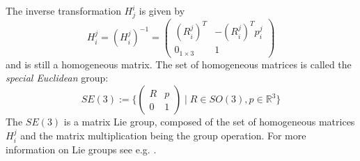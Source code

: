 \documentclass[a4paper,twoside, openright,12pt]{report}
\begin{document}
The inverse transformation $ H_j^i $ is given by 
\[H_i^j = (H_i^j)^{-1} = \begin{pmatrix}(R_i^j)^T & -(R_i^j)^T p_i^j \\ 0_{1 \times 3} & 1\end{pmatrix} \]
and is still a homogeneous matrix.
The set of homogeneous matrices is called the \emph{special Euclidean} group:
\begin{equation}
	SE(3) := \{\begin{pmatrix}R & p\\0 & 1\end{pmatrix} \; | \; R \in SO(3), p \in \mathbb{R}^3\} 
\end{equation}
The $SE(3)$ is a matrix Lie group, composed of the set of homogeneous matrices $H_i^j$ and the matrix multiplication being the group operation. For more information on Lie groups see e.g. \cite{Stramigioli_01}.
\end{document}
